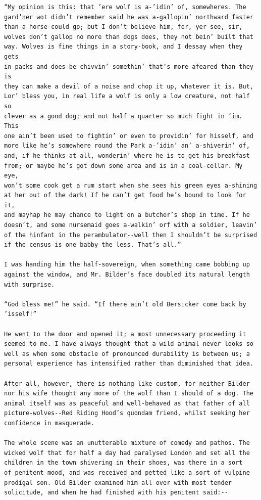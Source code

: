 \documentclass{article}
\begin{document}
\begin{verbatim}
“My opinion is this: that ’ere wolf is a-’idin’ of, somewheres. The
gard’ner wot didn’t remember said he was a-gallopin’ northward faster
than a horse could go; but I don’t believe him, for, yer see, sir,
wolves don’t gallop no more than dogs does, they not bein’ built that
way. Wolves is fine things in a story-book, and I dessay when they gets
in packs and does be chivvin’ somethin’ that’s more afeared than they is
they can make a devil of a noise and chop it up, whatever it is. But,
Lor’ bless you, in real life a wolf is only a low creature, not half so
clever as a good dog; and not half a quarter so much fight in ’im. This
one ain’t been used to fightin’ or even to providin’ for hisself, and
more like he’s somewhere round the Park a-’idin’ an’ a-shiverin’ of,
and, if he thinks at all, wonderin’ where he is to get his breakfast
from; or maybe he’s got down some area and is in a coal-cellar. My eye,
won’t some cook get a rum start when she sees his green eyes a-shining
at her out of the dark! If he can’t get food he’s bound to look for it,
and mayhap he may chance to light on a butcher’s shop in time. If he
doesn’t, and some nursemaid goes a-walkin’ orf with a soldier, leavin’
of the hinfant in the perambulator--well then I shouldn’t be surprised
if the census is one babby the less. That’s all.”

I was handing him the half-sovereign, when something came bobbing up
against the window, and Mr. Bilder’s face doubled its natural length
with surprise.

“God bless me!” he said. “If there ain’t old Bersicker come back by
’isself!”

He went to the door and opened it; a most unnecessary proceeding it
seemed to me. I have always thought that a wild animal never looks so
well as when some obstacle of pronounced durability is between us; a
personal experience has intensified rather than diminished that idea.

After all, however, there is nothing like custom, for neither Bilder
nor his wife thought any more of the wolf than I should of a dog. The
animal itself was as peaceful and well-behaved as that father of all
picture-wolves--Red Riding Hood’s quondam friend, whilst seeking her
confidence in masquerade.

The whole scene was an unutterable mixture of comedy and pathos. The
wicked wolf that for half a day had paralysed London and set all the
children in the town shivering in their shoes, was there in a sort
of penitent mood, and was received and petted like a sort of vulpine
prodigal son. Old Bilder examined him all over with most tender
solicitude, and when he had finished with his penitent said:--


\end{verbatim}
\end{document}
